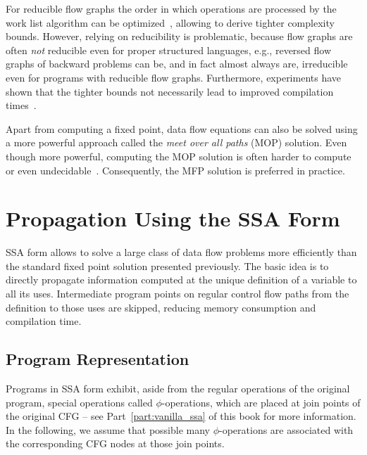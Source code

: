 For reducible flow graphs the order in which operations are processed by the
work list algorithm can be
optimized~\cite{novillo:bib:HU73,novillo:bib:KU76,novillo:bib:NNH99}, allowing
to derive tighter complexity bounds. However, relying on reducibility is
problematic, because flow graphs are often \emph{not} reducible even for proper
structured languages, e.g., reversed flow graphs of backward problems can be,
and in fact almost always are, irreducible even for programs with reducible flow
graphs. Furthermore, experiments have shown that the tighter bounds not
necessarily lead to improved compilation times~\cite{novillo:bib:CTK06}.

Apart from computing a fixed point, data flow equations can also be solved using
a more powerful approach called the \emph{meet over all paths} (MOP) solution.
Even though more powerful, computing the MOP solution is often harder to compute
or even undecidable~\cite{novillo:bib:NNH99}. Consequently, the MFP solution is
preferred in practice.

\section{Propagation Using the SSA Form}
\label{novillo:sec:prop-engine}

SSA form allows to solve a large class of data flow problems more efficiently
than the standard fixed point solution presented previously. The basic idea is
to directly propagate information computed at the unique definition of a
variable to all its uses. Intermediate program points on regular control flow
paths from the definition to those uses are skipped, reducing memory consumption
and compilation time.

\subsection{Program Representation}

Programs in SSA form exhibit, aside from the regular operations of the original
program, special operations called $\phi$-operations, which are placed at join
points of the original CFG -- see Part~\ref{part:vanilla_ssa} of this book for
more information. In the following, we assume that possible many
$\phi$-operations are associated with the corresponding CFG nodes at those
join points.

